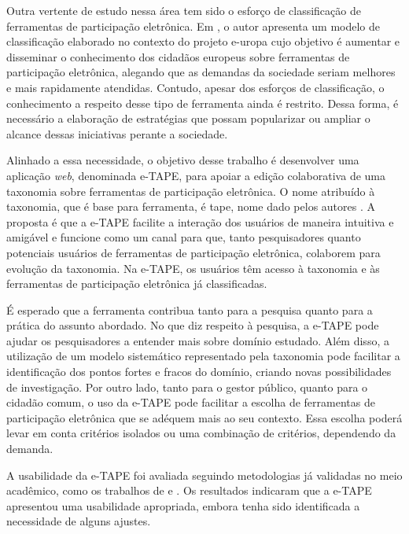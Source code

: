 \par
Outra vertente de estudo nessa área tem sido o esforço de classificação de ferramentas de participação eletrônica. Em  , o autor apresenta um modelo 
de classificação elaborado no contexto do projeto \acrfull{e-uropa} cujo objetivo é aumentar e disseminar o conhecimento dos cidadãos europeus sobre ferramentas de participação 
eletrônica, alegando que as demandas da sociedade seriam melhores e mais rapidamente atendidas. Contudo, apesar dos esforços de classificação, o conhecimento a respeito desse 
tipo de ferramenta ainda é restrito. Dessa forma, é necessário a elaboração de estratégias que possam popularizar ou ampliar o alcance dessas iniciativas perante a sociedade.

\par
Alinhado a essa necessidade, o objetivo desse trabalho é desenvolver uma aplicação \textit{web}, denominada e-TAPE, para apoiar a edição colaborativa de uma taxonomia sobre 
ferramentas de participação eletrônica. O nome atribuído à taxonomia, que é base para ferramenta, é \acrfull{tape}, nome dado pelos autores . 
A proposta é que a e-TAPE facilite a interação dos usuários de maneira intuitiva e amigável e funcione como um canal para que, tanto pesquisadores quanto potenciais usuários de
ferramentas de participação eletrônica, colaborem para evolução da taxonomia. Na e-TAPE, os usuários têm acesso à taxonomia e às ferramentas de participação eletrônica já classificadas.


\par
É esperado que a ferramenta contribua tanto para a pesquisa quanto para a prática do assunto abordado. No que diz respeito à pesquisa, a e-TAPE pode ajudar os pesquisadores a entender mais sobre domínio estudado. Além disso, a utilização de um modelo sistemático representado pela taxonomia 
pode facilitar a identificação dos pontos fortes e fracos do domínio, criando novas possibilidades de investigação. Por outro lado, tanto para o gestor público, quanto para o cidadão comum, 
o uso da e-TAPE pode facilitar a escolha de ferramentas de participação eletrônica que se adéquem mais ao seu contexto. Essa escolha poderá levar em conta critérios 
isolados ou uma combinação de critérios, dependendo da demanda. 

\par
A usabilidade da e-TAPE foi avaliada seguindo metodologias já validadas no meio acadêmico, como os trabalhos de  e . Os resultados indicaram que a e-TAPE apresentou uma usabilidade apropriada, embora tenha sido identificada a necessidade de alguns ajustes. 

